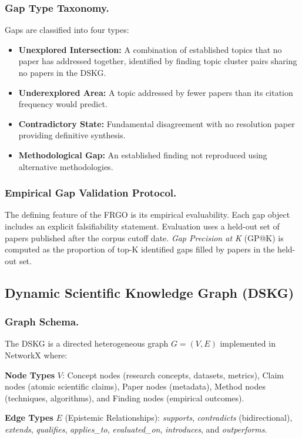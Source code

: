 \subsubsection{Gap Type Taxonomy.}
Gaps are classified into four types:
\begin{itemize}
    \item \textbf{Unexplored Intersection:} A combination of established topics that no paper has addressed together, identified by finding topic cluster pairs sharing no papers in the DSKG.
    \item \textbf{Underexplored Area:} A topic addressed by fewer papers than its citation frequency would predict.
    \item \textbf{Contradictory State:} Fundamental disagreement with no resolution paper providing definitive synthesis.
    \item \textbf{Methodological Gap:} An established finding not reproduced using alternative methodologies.
\end{itemize}

\subsubsection{Empirical Gap Validation Protocol.}
The defining feature of the FRGO is its empirical evaluability. Each gap object includes an explicit falsifiability statement. Evaluation uses a held-out set of papers published after the corpus cutoff date. \emph{Gap Precision at K} (GP@K) is computed as the proportion of top-K identified gaps filled by papers in the held-out set.

\subsection{Dynamic Scientific Knowledge Graph (DSKG)}

\subsubsection{Graph Schema.}
The DSKG is a directed heterogeneous graph $G = (V, E)$ implemented in NetworkX where:

\noindent\textbf{Node Types} $V$: Concept nodes (research concepts, datasets, metrics), Claim nodes (atomic scientific claims), Paper nodes (metadata), Method nodes (techniques, algorithms), and Finding nodes (empirical outcomes).

\noindent\textbf{Edge Types} $E$ (Epistemic Relationships): \emph{supports}, \emph{contradicts} (bidirectional), \emph{extends}, \emph{qualifies}, \emph{applies\_to}, \emph{evaluated\_on}, \emph{introduces}, and \emph{outperforms}.

